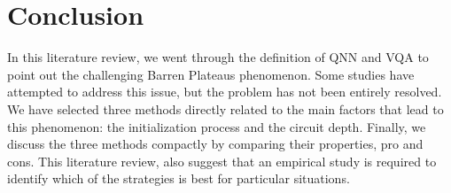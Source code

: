 \section{Conclusion}
In this literature review, we went through the definition of QNN and VQA to point out the challenging Barren Plateaus phenomenon. 
Some studies have attempted to address this issue, but the problem has not been entirely resolved.
We have selected three methods directly related to the main factors that lead to this phenomenon: the initialization process and the circuit depth.
Finally, we discuss the three methods compactly by comparing their properties, pro and cons.
This literature review, also suggest that an empirical study is required to identify which of the strategies is best for particular situations.